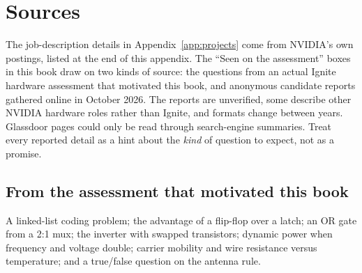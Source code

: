 \chapter{Sources}
\label{app:sources}

The job-description details in Appendix~\ref{app:projects} come from NVIDIA's own postings, listed at the end of this appendix. The ``Seen on the assessment'' boxes in this book draw on two kinds of source: the questions from an actual Ignite hardware assessment that motivated this book, and anonymous candidate reports gathered online in October 2026. The reports are unverified, some describe other NVIDIA hardware roles rather than Ignite, and formats change between years. Glassdoor pages could only be read through search-engine summaries. Treat every reported detail as a hint about the \emph{kind} of question to expect, not as a promise.

\section*{From the assessment that motivated this book}
A linked-list coding problem; the advantage of a flip-flop over a latch; an OR gate from a 2:1 mux; the inverter with swapped transistors; dynamic power when frequency and voltage double; carrier mobility and wire resistance versus temperature; and a true/false question on the antenna rule.

